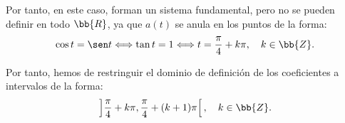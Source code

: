 \documentclass[12pt]{article}
\begin{document}
\begin{ejercicio}
\begin{description}
            Por tanto, en este caso, forman un sistema fundamental, pero no se pueden definir en todo $\bb{R}$, ya que $a(t)$ se anula en los puntos de la forma:
            \begin{equation*}
                \cos t=\sen t\Longleftrightarrow \tan t=1\Longleftrightarrow t=\dfrac{\pi}{4}+k\pi,\quad k\in\bb{Z}.
            \end{equation*}

            Por tanto, hemos de restringuir el dominio de definición de los coeficientes a intervalos de la forma:
            \begin{equation*}
                \left]\dfrac{\pi}{4}+k\pi,\dfrac{\pi}{4}+(k+1)\pi\right[,\quad k\in\bb{Z}.
            \end{equation*}
        \end{description}
    \end{ejercicio}
\end{document}
